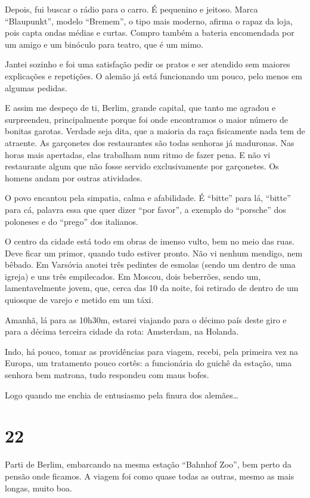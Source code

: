 Depois, fui buscar o rádio para o carro. É pequenino e jeitoso. Marca ``Blaupunkt'', modelo ``Bremem'', o tipo mais moderno, afirma o rapaz da loja, pois capta ondas médias e curtas. Compro também a bateria encomendada por um amigo e um binóculo para teatro, que é um mimo.

Jantei sozinho e foi uma satisfação pedir os pratos e ser atendido sem maiores explicações e repetições. O alemão já está funcionando um pouco, pelo menos em algumas pedidas.

E assim me despeço de ti, Berlim, grande capital, que tanto me agradou e surpreendeu, principalmente porque foi onde encontramos o maior número de bonitas garotas. Verdade seja dita, que a maioria da raça fisicamente nada tem de atraente. As garçonetes dos restaurantes são todas senhoras já maduronas. Nas horas mais apertadas, elas trabalham num ritmo de fazer pena. E não vi restaurante algum que não fosse servido exclusivamente por garçonetes. Os homens andam por outras atividades.

O povo encantou pela simpatia, calma e afabilidade. É ``bitte'' para lá, ``bitte'' para cá, palavra essa que quer dizer ``por favor'', a exemplo do ``porsche'' dos poloneses e do ``prego'' dos italianos.

O centro da cidade está todo em obras de imenso vulto, bem no meio das ruas. Deve ficar um primor, quando tudo estiver pronto. Não vi nenhum mendigo, nem bêbado. Em Varsóvia anotei três pedintes de esmolas (sendo um dentro de uma igreja) e uns três empilecados. Em Moscou, dois beberrões, sendo um, lamentavelmente jovem, que, cerca das 10 da noite, foi retirado de dentro de um quiosque de varejo e metido em um táxi.

Amanhã, lá para as 10h30m, estarei viajando para o décimo país deste giro e para a décima terceira cidade da rota: Amsterdam, na Holanda.

Indo, há pouco, tomar as providências para viagem, recebi, pela primeira vez na Europa, um tratamento pouco cortês: a funcionária do guichê da estação, uma senhora bem matrona, tudo respondeu com maus bofes.

Logo quando me enchia de entusiasmo pela finura dos alemães\ldots

\section*{22 \adfflatleafright {}}
Parti de Berlim, embarcando na mesma estação ``Bahnhof Zoo'', bem perto da pensão onde ficamos. A viagem foi como quase todas as outras, mesmo as mais longas, muito boa.

